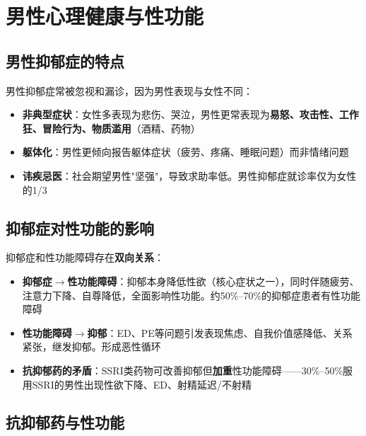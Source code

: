 \section{男性心理健康与性功能}
\label{sec:male_mental_health}

\subsection{男性抑郁症的特点}

男性抑郁症常被忽视和漏诊，因为男性表现与女性不同：

\begin{itemize}[leftmargin=2cm]
	\item \textbf{非典型症状}：女性多表现为悲伤、哭泣，男性更常表现为\textbf{易怒、攻击性、工作狂、冒险行为、物质滥用}（酒精、药物）
	\item \textbf{躯体化}：男性更倾向报告躯体症状（疲劳、疼痛、睡眠问题）而非情绪问题
	\item \textbf{讳疾忌医}：社会期望男性"坚强"，导致求助率低。男性抑郁症就诊率仅为女性的1/3
\end{itemize}

\subsection{抑郁症对性功能的影响}

抑郁症和性功能障碍存在\textbf{双向关系}：

\begin{itemize}[leftmargin=2cm]
	\item \textbf{抑郁症$\rightarrow$性功能障碍}：抑郁本身降低性欲（核心症状之一），同时伴随疲劳、注意力下降、自尊降低，全面影响性功能。约50\%--70\%的抑郁症患者有性功能障碍
	\item \textbf{性功能障碍$\rightarrow$抑郁}：ED、PE等问题引发表现焦虑、自我价值感降低、关系紧张，继发抑郁。形成恶性循环
	\item \textbf{抗抑郁药的矛盾}：SSRI类药物可改善抑郁但\textbf{加重}性功能障碍——30\%--50\%服用SSRI的男性出现性欲下降、ED、射精延迟/不射精
\end{itemize}

\subsection{抗抑郁药与性功能}

